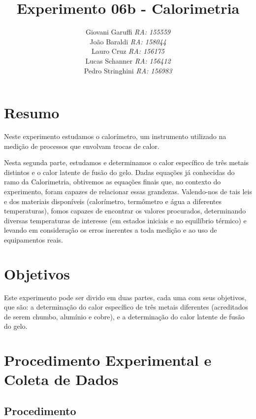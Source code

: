 \documentclass[12pt,a4paper]{article}
\begin{document}
\title{\vspace{70mm}\Huge Experimento 06b - Calorimetria}
\author{ Giovani Garuffi\qquad\hfill
		\textit {RA: 155559}\protect\\
		João Baraldi\hfill
		\textit{RA: 158044}\protect\\
		Lauro Cruz\hfill
		\textit{RA: 156175}\protect\\
		Lucas Schanner\hfill
		\textit{RA: 156412}\protect\\
		Pedro Stringhini\hfill
		\textit {RA: 156983}								
		}
\maketitle
\newpage
\section{Resumo}
Neste experimento estudamos o calorímetro, um instrumento utilizado na medição de processos que envolvam trocas de calor.

Nesta segunda parte, estudamos e determinamos o calor específico de três metais distintos e o calor latente de fusão do gelo. Dadas equações já conhecidas do ramo da Calorimetria, obtivemos as equações finais que, no contexto do experimento, foram capazes de relacionar essas grandezas. Valendo-nos de tais leis e dos materiais disponíveis (calorímetro, termômetro e água a diferentes temperaturas),
fomos capazes de encontrar os valores procurados, determinando diversas
temperaturas de interesse (em estados iniciais e no equilíbrio térmico)
e levando em consideração os erros inerentes a toda medição e ao uso
de equipamentos reais.

\section{Objetivos}
Este experimento pode ser divido em duas partes, cada uma com seus objetivos, que são: a determinação do calor específico de três metais diferentes (acreditados de serem chumbo, alumínio e cobre), e a determinação do calor latente de fusão do gelo. 


\section{Procedimento Experimental e Coleta de Dados}


\subsection{Procedimento}
\end{document}

